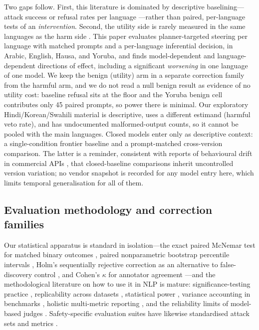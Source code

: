 Two gaps follow. First, this literature is dominated by descriptive
baselining---attack success or refusal rates per language
\citep{wang2024all,deng2024multilingual}---rather than paired, per-language tests
of an \emph{intervention}. Second, the utility side is rarely measured in the
same languages as the harm side \citep{rottger2024xstest}. This paper evaluates
planner-targeted steering per language with matched prompts and a per-language
inferential decision, in Arabic, English, Hausa, and Yoruba, and finds
model-dependent and language-dependent directions of effect, including a
significant \emph{worsening} in one language of one model. We keep the benign
(utility) arm in a separate correction family from the harmful arm, and we do
not read a null benign result as evidence of no utility cost: baseline refusal
sits at the floor and the Yoruba benign cell contributes only 45 paired prompts,
so power there is minimal. Our exploratory Hindi/Korean/Swahili material is
descriptive, uses a different estimand (harmful veto rate), and has undocumented
malformed-output counts, so it cannot be pooled with the main languages. Closed
models enter only as descriptive context: a single-condition frontier baseline
and a prompt-matched cross-version comparison. The latter is a reminder,
consistent with reports of behavioural drift in commercial APIs
\citep{chen2023chatgptbehavior}, that closed-baseline comparisons inherit
uncontrolled version variation; no vendor snapshot is recorded for any model
entry here, which limits temporal generalisation for all of them.

\subsection{Evaluation methodology and correction families}

Our statistical apparatus is standard in isolation---the exact paired McNemar
test for matched binary outcomes \citep{mcnemar1947note}, paired nonparametric
bootstrap percentile intervals \citep{efron1993introduction}, Holm's
sequentially rejective correction \citep{holm1979simple} as an alternative to
false-discovery control \citep{benjamini1995controlling}, and Cohen's $\kappa$
for annotator agreement \citep{cohen1960coefficient}---and the methodological
literature on how to use it in NLP is mature: significance-testing practice
\citep{dror2018hitchhiker}, replicability across datasets
\citep{dror2017replicability}, statistical power \citep{card2020little},
variance accounting in benchmarks \citep{bouthillier2021accounting}, holistic
multi-metric reporting \citep{liang2023holistic}, and the reliability limits of
model-based judges \citep{zheng2023judging}. Safety-specific evaluation suites
have likewise standardised attack sets and metrics
\citep{zou2023universal,mazeika2024harmbench,chao2024jailbreakbench,shen2024donowanything}.

